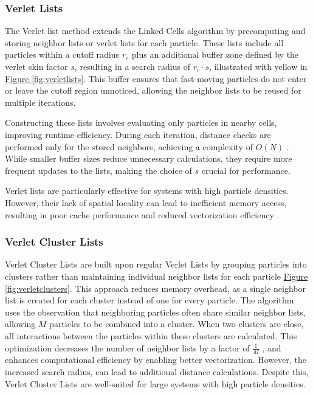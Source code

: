 \subsubsection{Verlet Lists}

The Verlet list method extends the Linked Cells algorithm by precomputing and storing neighbor lists or verlet lists for each particle. These lists include all particles within a cutoff radius \(r_c\) plus an additional buffer zone defined by the verlet skin factor \(s\), resulting in a search radius of \(r_c \cdot s\), illustrated with yellow in \hyperref[fig:verletlists]{Figure \ref*{fig:verletlists}}. This buffer ensures that fast-moving particles do not enter or leave the cutoff region unnoticed, allowing the neighbor lists to be reused for multiple iterations.

Constructing these lists involves evaluating only particles in nearby cells, improving runtime efficiency. During each iteration, distance checks are performed only for the stored neighbors, achieving a complexity of \(O(N)\) \parencite{yao2004improved}. While smaller buffer sizes reduce unnecessary calculations, they require more frequent updates to the lists, making the choice of \(s\) crucial for performance.

Verlet lists are particularly effective for systems with high particle densities. However, their lack of spatial locality can lead to inefficient memory access, resulting in poor cache performance and reduced vectorization efficiency \parencite{gratl2022n}.


\subsubsection{Verlet Cluster Lists}

Verlet Cluster Lists are built upon regular Verlet Lists by grouping particles into clusters rather than maintaining individual neighbor lists for each particle \hyperref[fig:verletclusters]{Figure \ref*{fig:verletclusters}}. This approach reduces memory overhead, as a single neighbor list is created for each cluster instead of one for every particle. The algorithm uses the observation that neighboring particles often share similar neighbor lists, allowing $M$ particles to be combined into a cluster. When two clusters are close, all interactions between the particles within these clusters are calculated. This optimization decreases the number of neighbor lists by a factor of $\frac{1}{M}$ \parencite{gratl2022n}, and enhances computational efficiency by enabling better vectorization. However, the increased search radius, can lead to additional distance calculations. Despite this, Verlet Cluster Lists are well-suited for large systems with high particle densities.

